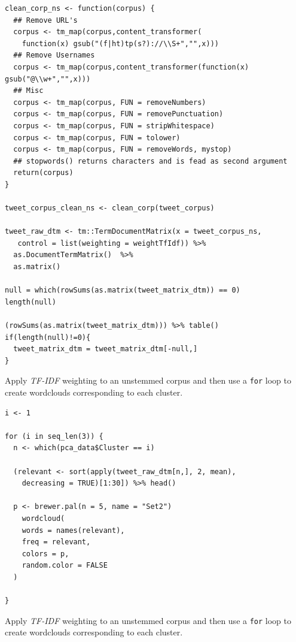 \documentclass[11pt]{article}
\begin{document}
\begin{listing}[htbp]
\begin{verbatim}
clean_corp_ns <- function(corpus) {
  ## Remove URL's
  corpus <- tm_map(corpus,content_transformer(
    function(x) gsub("(f|ht)tp(s?)://\\S+","",x)))
  ## Remove Usernames
  corpus <- tm_map(corpus,content_transformer(function(x) gsub("@\\w+","",x)))
  ## Misc
  corpus <- tm_map(corpus, FUN = removeNumbers)
  corpus <- tm_map(corpus, FUN = removePunctuation)
  corpus <- tm_map(corpus, FUN = stripWhitespace)
  corpus <- tm_map(corpus, FUN = tolower)
  corpus <- tm_map(corpus, FUN = removeWords, mystop)
  ## stopwords() returns characters and is fead as second argument
  return(corpus)
}

tweet_corpus_clean_ns <- clean_corp(tweet_corpus)

tweet_raw_dtm <- tm::TermDocumentMatrix(x = tweet_corpus_ns,
   control = list(weighting = weightTfIdf)) %>%
  as.DocumentTermMatrix()  %>%
  as.matrix()

null = which(rowSums(as.matrix(tweet_matrix_dtm)) == 0)
length(null)

(rowSums(as.matrix(tweet_matrix_dtm))) %>% table()
if(length(null)!=0){
  tweet_matrix_dtm = tweet_matrix_dtm[-null,]
}

\end{verbatim}
\caption{\label{orga65511c}Apply \emph{TF-IDF} weighting to an unstemmed corpus and then use a \texttt{for} loop to create wordclouds corresponding to each cluster.}
\end{listing}

\begin{listing}[htbp]
\begin{verbatim}
i <- 1

for (i in seq_len(3)) {
  n <- which(pca_data$Cluster == i)

  (relevant <- sort(apply(tweet_raw_dtm[n,], 2, mean),
    decreasing = TRUE)[1:30]) %>% head()

  p <- brewer.pal(n = 5, name = "Set2")
    wordcloud(
    words = names(relevant),
    freq = relevant,
    colors = p,
    random.color = FALSE
  )

}
\end{verbatim}
\caption{\label{orgf357a80}Apply \emph{TF-IDF} weighting to an unstemmed corpus and then use a \texttt{for} loop to create wordclouds corresponding to each cluster.}
\end{listing}
\end{document}
